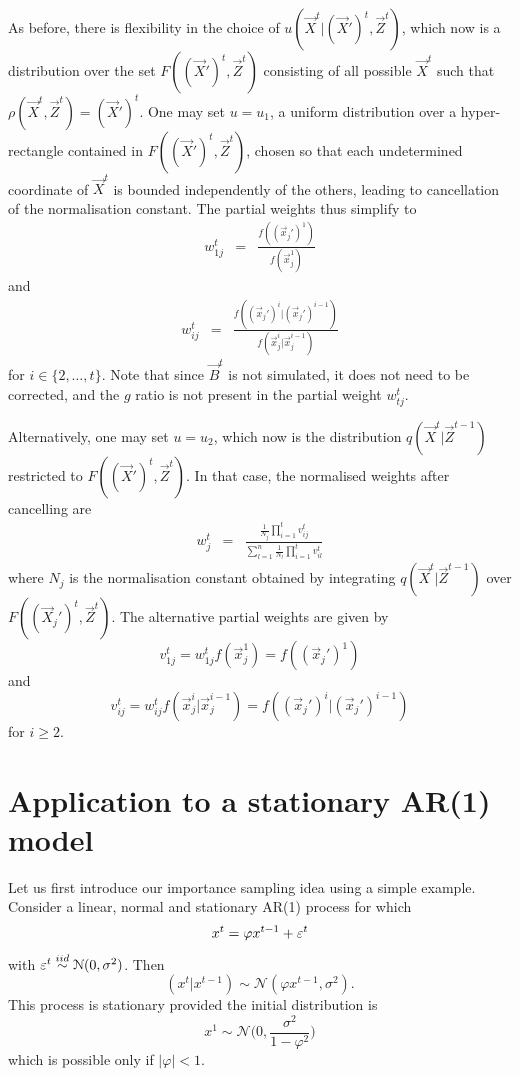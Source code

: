 As before, there is flexibility in the choice of $u(\vec{X}^t | (\vec{X}')^t, \vec{Z}^t)$, which now is a distribution over the set $F((\vec{X}')^t, \vec{Z}^t)$ consisting of all possible $\vec{X}^t$ such that $\rho(\vec{X}^t, \vec{Z}^t) = (\vec{X}')^t$. One may set $u = u_1$, a uniform distribution over a hyper-rectangle contained in $F((\vec{X}')^t, \vec{Z}^t)$, chosen so that each undetermined coordinate of $\vec{X}^t$ is bounded independently of the others, leading to cancellation of the normalisation constant. The partial weights thus simplify to
\begin{eqnarray*}
w^{t}_{1j} &=& \frac{f((\vec{x}_j')^1)}{f(\vec{x}_j^1)}
\end{eqnarray*}
and
\begin{eqnarray*}
w^{t}_{ij} &=& \frac{f((\vec{x}_j')^i | (\vec{x}_j')^{i-1})}{f(\vec{x}_j^i | \vec{x}_j^{i-1})}
\end{eqnarray*}
for $i \in \{ 2, \ldots, t \}$. Note that since $\vec{B}^t$ is not simulated, it does not need to be corrected, and the $g$ ratio is not present in the partial weight $w^{t}_{tj}$.

Alternatively, one may set $u = u_2$, which now is the distribution $q(\vec{X}^t | \vec{Z}^{t-1})$ restricted to $F((\vec{X}')^t, \vec{Z}^t)$. In that case, the normalised weights after cancelling are
\begin{eqnarray*}
w^{t}_j &=& \frac{\frac{1}{N_j} \prod_{i=1}^t v^{t}_{ij}}{\sum_{l=1}^n \frac{1}{N_l}\prod_{i=1}^t v^{t}_{il}}
\end{eqnarray*}
where $N_j$ is the normalisation constant obtained by integrating $q(\vec{X}^{t} | \vec{Z}^{t-1})$ over $F((\vec{X}_j')^t, \vec{Z}^t)$. The alternative partial weights are given by
\[
v^{t}_{1j} = w^{t}_{1j} f(\vec{x}_j^1) = f((\vec{x}_j')^1)
\]
and
\[
v^{t}_{ij} = w^{t}_{ij} f(\vec{x}_j^i | \vec{x}_j^{i-1}) = f((\vec{x}_j')^i | (\vec{x}_j')^{i-1}) 
\]
for $i \geq 2$. 





\section{Application to a stationary AR(1) model}
\label{sec:3}

Let us first introduce our importance sampling idea using a simple example. Consider a linear, normal and stationary AR(1) process for which
\begin{equation*}
    x^{t} = \varphi x^{t-1} + \varepsilon^{t}
\end{equation*}
with $\varepsilon^{t} \stackrel{iid}{\sim} \mathcal{N}(0, \sigma^{2})$. Then
\begin{equation*}
    (x^{t} | x^{t-1}) \sim \mathcal{N} (\varphi x^{t-1}, \sigma^{2}).
\end{equation*}
This process is stationary provided the initial distribution is
\begin{equation*}
    x^{1} \sim \mathcal{N} \Bigg (0, \frac{\sigma^2}{1- \varphi^2} \Bigg )
\end{equation*}
which is possible only if $|\varphi| < 1$. 

